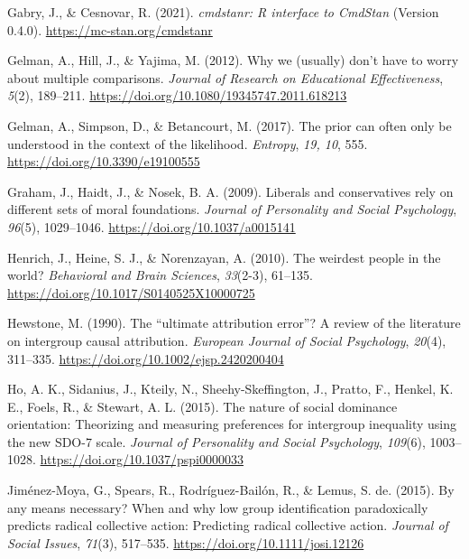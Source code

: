 \documentclass[twocolumn, 11pt, letterpaper]{article}
\newenvironment{CSLReferences}[2]{}{}
\begin{document}
\begin{CSLReferences}{1}{0}
\leavevmode{}%
Gabry, J., \& Cesnovar, R. (2021). \emph{{cmdstanr}: {R} interface to
{CmdStan}} (Version 0.4.0). \url{https://mc-stan.org/cmdstanr}

\leavevmode{}%
Gelman, A., Hill, J., \& Yajima, M. (2012). Why we (usually) don't have
to worry about multiple comparisons. \emph{Journal of Research on
Educational Effectiveness}, \emph{5}(2), 189--211.
\url{https://doi.org/10.1080/19345747.2011.618213}

\leavevmode{}%
Gelman, A., Simpson, D., \& Betancourt, M. (2017). The prior can often
only be understood in the context of the likelihood. \emph{Entropy},
\emph{19, 10}, 555. \url{https://doi.org/10.3390/e19100555}

\leavevmode{}%
Graham, J., Haidt, J., \& Nosek, B. A. (2009). Liberals and
conservatives rely on different sets of moral foundations. \emph{Journal
of Personality and Social Psychology}, \emph{96}(5), 1029--1046.
\url{https://doi.org/10.1037/a0015141}

\leavevmode{}%
Henrich, J., Heine, S. J., \& Norenzayan, A. (2010). The weirdest people
in the world? \emph{Behavioral and Brain Sciences}, \emph{33}(2-3),
61--135. \url{https://doi.org/10.1017/S0140525X10000725}

\leavevmode{}%
Hewstone, M. (1990). The {``ultimate attribution error''}? {A} review of
the literature on intergroup causal attribution. \emph{European Journal
of Social Psychology}, \emph{20}(4), 311--335.
\url{https://doi.org/10.1002/ejsp.2420200404}

\leavevmode{}%
Ho, A. K., Sidanius, J., Kteily, N., Sheehy-Skeffington, J., Pratto, F.,
Henkel, K. E., Foels, R., \& Stewart, A. L. (2015). The nature of social
dominance orientation: {Theorizing} and measuring preferences for
intergroup inequality using the new {SDO}-7 scale. \emph{Journal of
Personality and Social Psychology}, \emph{109}(6), 1003--1028.
\url{https://doi.org/10.1037/pspi0000033}

\leavevmode{}%
Jiménez-Moya, G., Spears, R., Rodríguez-Bailón, R., \& Lemus, S. de.
(2015). By any means necessary? {When} and why low group identification
paradoxically predicts radical collective action: Predicting radical
collective action. \emph{Journal of Social Issues}, \emph{71}(3),
517--535. \url{https://doi.org/10.1111/josi.12126}


\end{CSLReferences}
\end{document}
